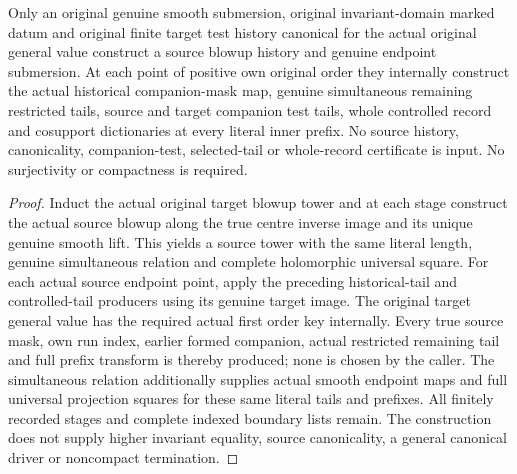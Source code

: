 \begin{theorem}
\label{hir:historical-control-original-production}
\leanok
Only an original genuine smooth submersion, original invariant-domain marked datum and original finite target test history canonical for the actual original general value construct a source blowup history and genuine endpoint submersion. At each point of positive own original order they internally construct the actual historical companion-mask map, genuine simultaneous remaining restricted tails, source and target companion test tails, whole controlled record and cosupport dictionaries at every literal inner prefix. No source history, canonicality, companion-test, selected-tail or whole-record certificate is input. No surjectivity or compactness is required.
\end{theorem}
\begin{proof}
Induct the actual original target blowup tower and at each stage construct the actual source blowup along the true centre inverse image and its unique genuine smooth lift. This yields a source tower with the same literal length, genuine simultaneous relation and complete holomorphic universal square. For each actual source endpoint point, apply the preceding historical-tail and controlled-tail producers using its genuine target image. The original target general value has the required actual first order key internally. Every true source mask, own run index, earlier formed companion, actual restricted remaining tail and full prefix transform is thereby produced; none is chosen by the caller. The simultaneous relation additionally supplies actual smooth endpoint maps and full universal projection squares for these same literal tails and prefixes. All finitely recorded stages and complete indexed boundary lists remain. The construction does not supply higher invariant equality, source canonicality, a general canonical driver or noncompact termination.
\end{proof}
